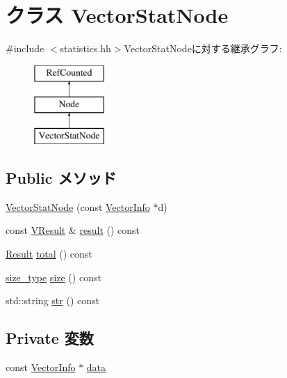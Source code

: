 \hypertarget{classStats_1_1VectorStatNode}{
\section{クラス VectorStatNode}
\label{classStats_1_1VectorStatNode}
}


{\ttfamily \#include $<$statistics.hh$>$}VectorStatNodeに対する継承グラフ:\begin{figure}[H]
\begin{center}
\leavevmode
\includegraphics[height=3cm]{classStats_1_1VectorStatNode}
\end{center}
\end{figure}
\subsection*{Public メソッド}
\begin{DoxyCompactItemize}
\item 
\hyperlink{classStats_1_1VectorStatNode_ac1b3c9ea9bbf5739d66c078719b5d595}{VectorStatNode} (const \hyperlink{classStats_1_1VectorInfo}{VectorInfo} $\ast$d)
\item 
const \hyperlink{classstd_1_1vector}{VResult} \& \hyperlink{classStats_1_1VectorStatNode_aba312f9e3431b1652f8b3ddf3fe105dc}{result} () const 
\item 
\hyperlink{namespaceStats_ad874d2cfd4b4a29ebd480bb2e67f20ae}{Result} \hyperlink{classStats_1_1VectorStatNode_a35c6e2ed3fc81b40d69052a062113ead}{total} () const 
\item 
\hyperlink{namespaceStats_ada51e68d31936547d3729c82daf6b7c6}{size\_\-type} \hyperlink{classStats_1_1VectorStatNode_a503ab01f6c0142145d3434f6924714e7}{size} () const 
\item 
std::string \hyperlink{classStats_1_1VectorStatNode_a1b9b8885b0880fc4ddf9a2c7d1ca3dc4}{str} () const 
\end{DoxyCompactItemize}
\subsection*{Private 変数}
\begin{DoxyCompactItemize}
\item 
const \hyperlink{classStats_1_1VectorInfo}{VectorInfo} $\ast$ \hyperlink{classStats_1_1VectorStatNode_a98008fa38e5a02bb16056a1b7579660e}{data}
\end{DoxyCompactItemize}


